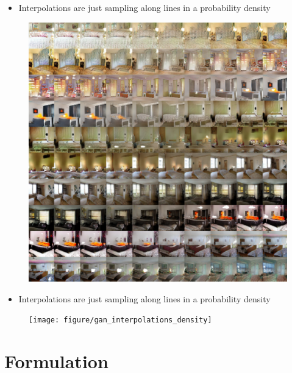 \documentclass[10pt,mathserif]{beamer}
\begin{document}
\begin{frame}
\begin{itemize}
\item Interpolations are just sampling along lines in a probability density
\end{itemize}
\begin{figure}[ht]
  \centering
  \includegraphics[width=0.35\paperwidth]{figure/gans_interpolations}
  \caption{\label{fig:gan_interpolations} }
\end{figure}
\end{frame}

\begin{frame}
\begin{itemize}
  \item Interpolations are just sampling along lines in a probability density
\end{itemize}
\begin{figure}[ht]
  \centering
  \texttt{[image: figure/gan\_interpolations\_density]}
  \caption{\label{fig:gan_interpolations_density} }
\end{figure}
\end{frame}

\section{Formulation}
\end{document}
